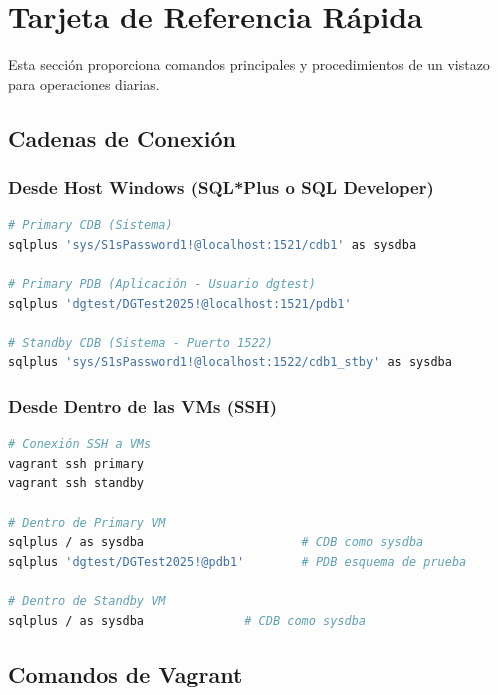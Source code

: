 \documentclass[11pt, a4paper]{report}
\begin{document}
\newpage


\chapter{Tarjeta de Referencia Rápida}

Esta sección proporciona comandos principales y procedimientos de un vistazo para operaciones diarias.

\section{Cadenas de Conexión}

\subsection{Desde Host Windows (SQL*Plus o SQL Developer)}

\begin{lstlisting}[language=bash, caption={Conexiones desde Windows Host}]
# Primary CDB (Sistema)
sqlplus 'sys/S1sPassword1!@localhost:1521/cdb1' as sysdba

# Primary PDB (Aplicación - Usuario dgtest)
sqlplus 'dgtest/DGTest2025!@localhost:1521/pdb1'

# Standby CDB (Sistema - Puerto 1522)
sqlplus 'sys/S1sPassword1!@localhost:1522/cdb1_stby' as sysdba
\end{lstlisting}

\subsection{Desde Dentro de las VMs (SSH)}

\begin{lstlisting}[language=bash, caption={Conexiones Locales en VMs}]
# Conexión SSH a VMs
vagrant ssh primary
vagrant ssh standby

# Dentro de Primary VM
sqlplus / as sysdba                      # CDB como sysdba
sqlplus 'dgtest/DGTest2025!@pdb1'        # PDB esquema de prueba

# Dentro de Standby VM
sqlplus / as sysdba              # CDB como sysdba
\end{lstlisting}

\section{Comandos de Vagrant}
\end{document}
